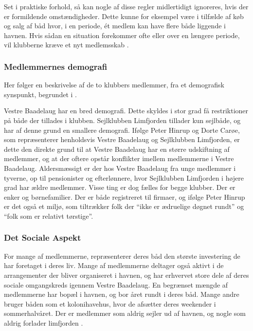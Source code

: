Set i praktiske forhold, så kan nogle af disse regler midlertidigt ignoreres, hvis der er formildende omstændigheder. Dette kunne for eksempel være i tilfælde af køb og salg af båd hvor, i en periode, ét medlem kan have flere både liggende i havnen. Hvis sådan en situation forekommer ofte eller over en længere periode, vil klubberne kræve et nyt medlemsskab \cite{int_vb_sl}.

\subsubsection{Medlemmernes demografi}

Her følger en beskrivelse af de to klubbers medlemmer, fra et demografisk synspunkt, begrundet i \cite{int_vb_sl}.

Vestre Baadelaug har en bred demografi. Dette skyldes i stor grad få restriktioner på både der tillades i klubben. Sejlklubben Limfjorden tillader kun sejlbåde, og har af denne grund en smallere demografi. Ifølge Peter Hinrup og Dorte Carøe, som repræsenterer henholdsvis Vestre Baadelaug og Sejlklubben Limfjorden, er dette den direkte grund til at Vestre Baadelaug har en større udskiftning af medlemmer, og at der oftere opstår konflikter imellem medlemmerne i Vestre Baadelaug. Aldersmæssigt er der hos Vestre Baadelaug fra unge medlemmer i tyverne, op til pensionister og efterlønnere, hvor Sejlklubben Limfjorden i højere grad har ældre medlemmer. Visse ting er dog fælles for begge klubber. Der er enker og børnefamilier. Der er både registreret til firmaer, og ifølge Peter Hinrup er det også et miljø, som tiltrækker folk der \enquote{ikke er ædruelige døgnet rundt} og \enquote{folk som er relativt tørstige}.

\subsubsection{Det Sociale Aspekt}

For mange af medlemmerne, repræsenterer deres båd den største investering de har foretaget i deres liv. Mange af medlemmerne deltager også aktivt i de arrangementer der bliver organiseret i havnen, og har erhvervet store dele af deres sociale omgangskreds igennem Vestre Baadelaug. En begrænset mængde af medlemmerne har bopæl i havnen, og bor året rundt i deres båd. Mange andre bruger båden som et kolonihavehus, hvor de afsætter deres weekender i sommerhalvåret. Der er medlemmer som aldrig sejler ud af havnen, og nogle som aldrig forlader limfjorden \cite{int_vb_sl}.

